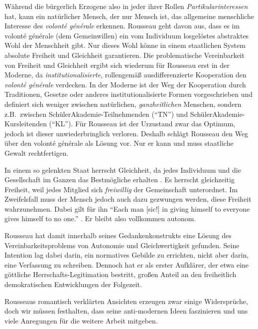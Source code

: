 Während die bürgerlich Erzogene also in jeder ihrer Rollen \emph{Partikularinteressen} hat, kann ein natürlicher Mensch, der nur Mensch ist, das allgemeine menschliche Interesse des \emph{volonté générale} erkennen.
Rousseau geht davon aus, dass es im volonté générale (dem Gemeinwillen) ein vom Individuum losgelöstes abstraktes Wohl der Menschheit gibt.
Nur dieses Wohl könne in einem staatlichen System absolute Freiheit und Gleichheit garantieren.
Die problematische Vereinbarkeit von Freiheit und Gleichheit ergibt sich wiederum für Rousseau erst in der Moderne, da \emph{institutionalisierte}, rollengemäß ausdifferenzierte Kooperation den \emph{volonté générale} verdecken.
In der Moderne ist der Weg der Kooperation durch Traditionen, Gesetze oder anderes institutionalisierte Formen vorgeschrieben und definiert sich weniger zwischen natürlichen, \emph{ganzheitlichen} Menschen, sondern z.B.\ zwischen SchülerAkademie-Teilnehmenden (``TN'') und SchülerAkademie-Kursleitenden (``KL'').
Für Rousseau ist der Urzustand zwar das Optimum, jedoch ist dieser unwiederbringlich verloren.
Deshalb schlägt Rousseau den Weg über den volonté générale als Lösung vor.
Nur er kann und muss staatliche Gewalt rechtfertigen.

In einem so gelenkten Staat herrscht Gleichheit, da jedes Individuum und die Gesellschaft im Ganzen das Bestmögliche erhalten \parencite[7]{Rousseau-1762-b}.
Es herrscht gleichzeitig Freiheit, weil jedes Mitglied sich \emph{freiwillig} der Gemeinschaft unterordnet.
Im Zweifelsfall muss der Mensch jedoch auch dazu gezwungen werden, diese Freiheit wahrzunehmen.
Dabei gilt für ihn ``Each man [sic!] in giving himself to everyone gives himself to no one.'' \parencite[7]{Rousseau-1762-b}.
Er bleibt also vollkommen autonom.

Rousseau hat damit innerhalb seines Gedankenkonstrukts eine Lösung des Vereinbarkeitsproblems von Autonomie und Gleichwertigkeit gefunden.
Seine Intention lag dabei darin, ein normatives Gebilde zu errichten, nicht aber darin, eine Verfassung zu schreiben.
Dennoch hat er als erster Aufklärer, der etwa eine göttliche Herrschafts-Legitimation bestritt, großen Anteil an den freiheitlich demokratischen Entwicklungen der Folgezeit.

Rousseaus romantisch verklärten Ansichten erzeugen zwar einige Widersprüche, doch wir müssen festhalten, dass seine anti-modernen Ideen faszinieren und uns viele Anregungen für die weitere Arbeit mitgeben.

